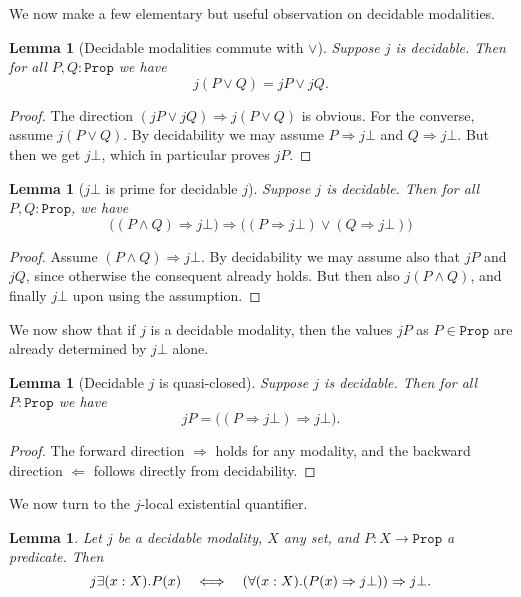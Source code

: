 \documentclass[reqno,11pt]{amsproc}
\theoremstyle{plain}
\newtheorem{lemma}[theorem]{Lemma}
\theoremstyle{definition}
\newcommand{\Const}[1]{\mathtt{#1}}
\renewcommand{\to}[1][]{\xrightarrow{#1}}
\newcommand{\prop}{\Const{Prop}}
\newcommand{\imp}{\Rightarrow}
\let\originalleft\left
\let\originalright\right
\renewcommand{\left}{\mathopen{}\mathclose\bgroup\originalleft}
\renewcommand{\right}{\aftergroup\egroup\originalright}
\numberwithin{equation}{section}
\begin{document}
We now make a few elementary but useful observation on decidable modalities.

\begin{lemma}[Decidable modalities commute with $\lor$]
	\label{prop.dec_mod_or}
	Suppose $j$ is decidable. Then for all $P,Q:\prop$ we have
	\[
		j (P \lor Q) = j P \lor j Q.
	\]
\end{lemma}

\begin{proof}
	The direction $(j P \lor j Q)\imp j (P \lor Q)$ is obvious. For the converse, assume $j (P \lor Q)$. By decidability we may assume $P\imp j \bot$ and $Q\imp j \bot$. But then we get $j \bot$, which in particular proves $j P$.
\end{proof}

\begin{lemma}[$j \bot$ is prime for decidable $j$]
Suppose $j$ is decidable. Then for all $P,Q:\prop$, we have
\[\big((P\land Q)\imp j \bot\big)\imp\big((P\imp j \bot)\lor(Q\imp j \bot)\big)\]
\end{lemma}

\begin{proof}
Assume $(P\land Q)\imp j \bot$. By decidability we may assume also that $j P$ and $j Q$, since otherwise the consequent already holds. But then also $j (P\land Q)$, and finally $j \bot$ upon using the assumption.
\end{proof}

We now show that if $j$ is a decidable modality, then the values $jP$ as $P \in \prop$ are already determined by $j\bot$ alone.

\begin{lemma}[Decidable $j$ is quasi-closed]
	Suppose $j$ is decidable. Then for all $P:\prop$ we have
	\[
		j P=\big((P\imp j\bot)\imp j\bot\big).
	\]
\end{lemma}

\begin{proof}
	The forward direction $\Rightarrow$ holds for any modality, and the backward direction $\Leftarrow$ follows directly from decidability.
\end{proof}

We now turn to the $j$-local existential quantifier.

\begin{lemma}
	Let $j$ be a decidable modality, $X$ any set, and $P : X \to \prop$ a predicate. Then
	\[
		j \exists (x : X) . P(x) \quad \Longleftrightarrow \quad \left( \forall (x : X). (P(x) \imp j \bot) \right) \imp j \bot.
	\]
\end{lemma}
\end{document}
